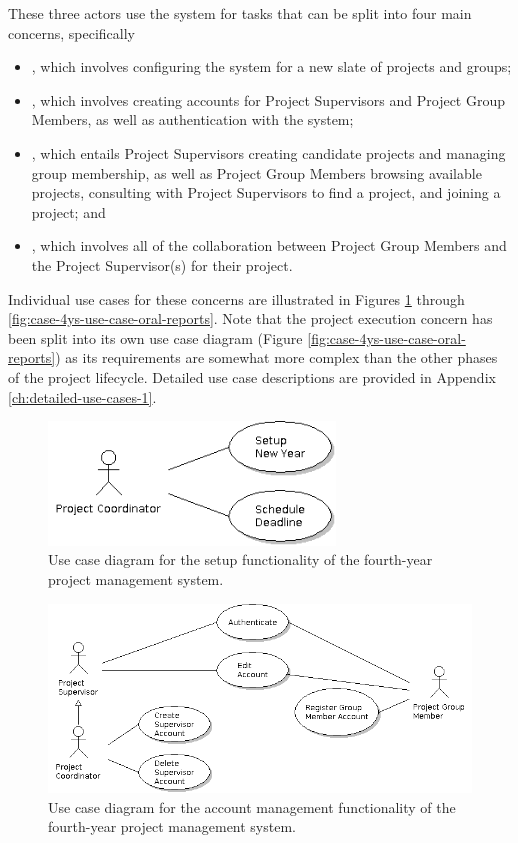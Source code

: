 \documentclass[document.tex]{subfiles}
\begin{document}
These three actors use the system for tasks that can be split into four main concerns, specifically
\begin{itemize}
\item {}, which involves configuring the system for a new slate of projects and groups;
\item {}, which involves creating accounts for Project Supervisors and Project Group Members, as well as authentication with the system;
\item {}, which entails Project Supervisors creating candidate projects and managing group membership, as well as Project Group Members browsing available projects, consulting with Project Supervisors to find a project, and joining a project; and
\item {}, which involves all of the collaboration between Project Group Members and the Project Supervisor(s) for their project.
\end{itemize}

Individual use cases for these concerns are illustrated in Figures \ref{fig:case-4ys-use-case-setup} through \ref{fig:case-4ys-use-case-oral-reports}. Note that the project execution concern has been split into its own use case diagram (Figure \ref{fig:case-4ys-use-case-oral-reports}) as its requirements are somewhat more complex than the other phases of the project lifecycle.
Detailed use case descriptions are provided in Appendix \ref{ch:detailed-use-cases-1}.

\begin{figure}[!ht]
\centering \includegraphics[width=3in]{./img/case-study-fourth-year-system/setup}
\caption{Use case diagram for the setup functionality of the fourth-year project management system.}
\label{fig:case-4ys-use-case-setup}
\end{figure}

\begin{figure}[!ht]
\centering \includegraphics[width=6in]{./img/case-study-fourth-year-system/account-management}
\caption{Use case diagram for the account management functionality of the fourth-year project management system.}
\label{fig:case-4ys-use-case-account-management}
\end{figure}
\end{document}
